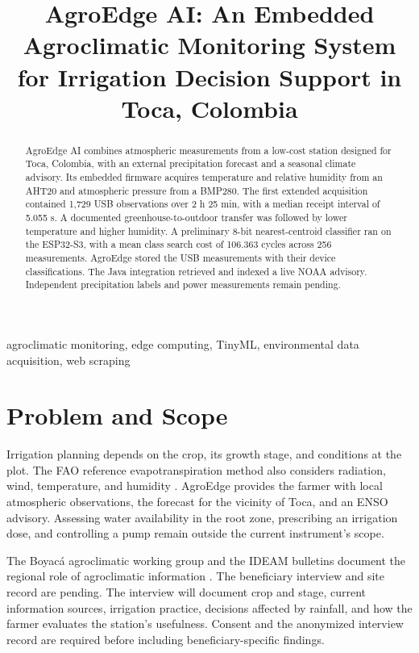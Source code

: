 \documentclass[conference]{IEEEtran}
\title{AgroEdge AI: An Embedded Agroclimatic Monitoring System for Irrigation Decision Support in Toca, Colombia}
\author{\IEEEauthorblockN{Juan Alejandro Castillo Arévalo and Sergio Andrés Guerrero Alba}
\IEEEauthorblockA{Data Engineering and Artificial Intelligence\\
Universidad Santo Tomás, Tunja Campus, Colombia}}
\begin{document}
\maketitle

\begin{abstract}
AgroEdge AI combines atmospheric measurements from a low-cost station designed for Toca, Colombia, with an external precipitation forecast and a seasonal climate advisory. Its embedded firmware acquires temperature and relative humidity from an AHT20 and atmospheric pressure from a BMP280. The first extended acquisition contained 1,729 USB observations over 2 h 25 min, with a median receipt interval of 5.055 s. A documented greenhouse-to-outdoor transfer was followed by lower temperature and higher humidity. A preliminary 8-bit nearest-centroid classifier ran on the ESP32-S3, with a mean class search cost of 106.363 cycles across 256 measurements. AgroEdge stored the USB measurements with their device classifications. The Java integration retrieved and indexed a live NOAA advisory. Independent precipitation labels and power measurements remain pending.
\end{abstract}

\begin{IEEEkeywords}
agroclimatic monitoring, edge computing, TinyML, environmental data acquisition, web scraping
\end{IEEEkeywords}

\section{Problem and Scope}
Irrigation planning depends on the crop, its growth stage, and conditions at the plot. The FAO reference evapotranspiration method also considers radiation, wind, temperature, and humidity \cite{fao}. AgroEdge provides the farmer with local atmospheric observations, the forecast for the vicinity of Toca, and an ENSO advisory. Assessing water availability in the root zone, prescribing an irrigation dose, and controlling a pump remain outside the current instrument's scope.

The Boyacá agroclimatic working group and the IDEAM bulletins document the regional role of agroclimatic information \cite{boyaca,ideam}. The beneficiary interview and site record are pending. The interview will document crop and stage, current information sources, irrigation practice, decisions affected by rainfall, and how the farmer evaluates the station's usefulness. Consent and the anonymized interview record are required before including beneficiary-specific findings.
\end{document}
